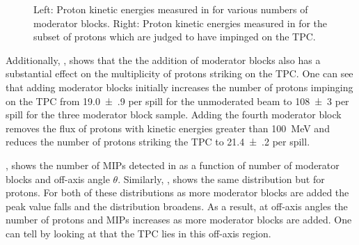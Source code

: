 \begin{figure}[h]
  \begin{minipage}[t]{.5\linewidth}
    \begin{adjustbox}{max totalsize=\textwidth, center}
      
    \end{adjustbox}
  \end{minipage}
  \hfill
  \begin{minipage}[t]{.5\linewidth}
    \begin{adjustbox}{max totalsize=\textwidth, center}
      
    \end{adjustbox}
  \end{minipage}
  \caption[Proton kinetic energies measured in \SThree]{Left: Proton kinetic energies measured in \SThree for various numbers of moderator blocks. Right: Proton kinetic energies measured in \SThree for the subset of protons which are judged to have impinged on the TPC.}
  \label{fig:protonKeData}
\end{figure}

Additionally, , shows that the the addition of moderator blocks also has a substantial effect on the multiplicity of protons striking on the TPC.
One can see that adding moderator blocks initially increases the number of protons impinging on the TPC from \num{19.0(9)} per spill for the unmoderated beam to \num{108(3)} per spill for the three moderator block sample.
Adding the fourth moderator block removes the flux of protons with kinetic energies greater than \SI{100}{\mega\electronvolt} and reduces the number of protons striking the TPC to \num{21.4(2)} per spill.

, shows the number of MIPs detected in \SThree as a function of number of moderator blocks and off-axis angle $\theta$.
Similarly, , shows the same distribution but for protons.
For both of these distributions as more moderator blocks are added the peak value falls and the distribution broadens.
As a result, at off-axis angles the number of protons and MIPs increases as more moderator blocks are added.
One can tell by looking at  that the TPC lies in this off-axis region.


